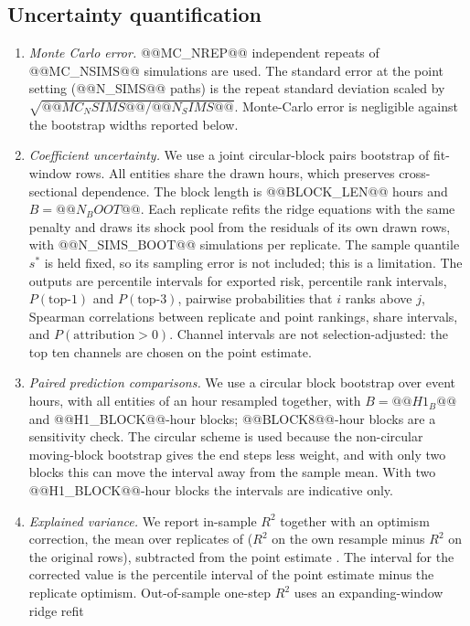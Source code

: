 \documentclass[referee,pdflatex,sn-mathphys-ay]{sn-jnl}
\theoremstyle{thmstyleone}%
\theoremstyle{thmstyletwo}%
\theoremstyle{thmstylethree}%
\begin{document}
\subsection{Uncertainty quantification}
\label{subsec:uncertainty}
\begin{enumerate}[label=(\alph*),leftmargin=*]
\item \emph{Monte Carlo error.} @@MC_NREP@@ independent repeats of @@MC_NSIMS@@ simulations are used.
The standard error at the point setting (@@N_SIMS@@ paths) is the repeat standard deviation scaled by
$\sqrt{@@MC_NSIMS@@/@@N_SIMS@@}$. Monte-Carlo error is negligible against the bootstrap widths reported below.
\item \emph{Coefficient uncertainty.} We use a joint circular-block pairs bootstrap of fit-window rows.
All entities share the drawn hours, which preserves cross-sectional dependence. The block length is
@@BLOCK_LEN@@ hours and $B=@@N_BOOT@@$. Each replicate refits the ridge equations with the same penalty
and draws its shock pool from the residuals of its own drawn rows, with @@N_SIMS_BOOT@@ simulations per
replicate. The sample quantile $s^\ast$ is held fixed, so its sampling error is not included; this is a
limitation. The outputs are percentile intervals for exported risk, percentile rank intervals,
$P(\text{top-1})$ and $P(\text{top-3})$, pairwise probabilities that $i$ ranks above $j$, Spearman
correlations between replicate and point rankings, share intervals, and $P(\text{attribution}>0)$.
Channel intervals are not selection-adjusted: the top ten channels are chosen on the point estimate.
\item \emph{Paired prediction comparisons.} We use a circular block bootstrap over event hours, with all
entities of an hour resampled together, with $B=@@H1_B@@$ and @@H1_BLOCK@@-hour blocks; @@BLOCK8@@-hour
blocks are a sensitivity check. The circular scheme is used because the non-circular moving-block
bootstrap \citep{kunsch1989jackknife} gives the end steps less weight, and with only two blocks this can
move the interval away from the sample mean. With two @@H1_BLOCK@@-hour blocks the intervals are indicative only.
\item \emph{Explained variance.} We report in-sample $R^2$ together with an optimism correction, the mean
over replicates of ($R^2$ on the own resample minus $R^2$ on the original rows), subtracted from the point
estimate \citep{efron1983estimating}. The interval for the corrected value is the percentile interval of the point estimate minus the
replicate optimism. Out-of-sample one-step $R^2$ uses an expanding-window ridge refit

\end{enumerate}
\end{document}
